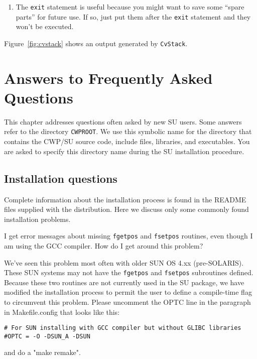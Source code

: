{{{{{{{\begin{enumerate}
\item The \verb:exit: statement is useful because you might want
to save some ``spare parts'' for future use.  If so, just put them
after the \verb:exit: statement and they won't be executed.
\end{enumerate}

\noindent Figure~\ref{fig:cvstack} shows an output generated by \verb:CvStack:.

\chapter{Answers to Frequently Asked Questions}

This chapter addresses questions often asked by new {\small\sf SU} users.
Some answers refer to the directory {\tt CWPROOT}.  We use this
symbolic name for the directory that contains the {\sf CWP/SU} source code, include files, libraries, and executables.  You are asked to specify
this directory name during the {\small\sf SU} installation procedure.

\section{Installation questions}
Complete information about the installation
process is found in the {\sf README}
files supplied with the distribution.
Here we discuss only some commonly found installation problems.

\begin{question}
I get error messages about missing {\tt fgetpos} and {\tt fsetpos} routines, 
even though I am using the {\sf GCC} compiler.
How do I get around this problem?
\end{question}

\begin{rmans}
We've seen this problem most often with older 
{\sf SUN OS} 4.xx (pre-{\sf SOLARIS}). 
These {\sf SUN} systems may not have the {\tt fgetpos} and {\tt fsetpos} subroutines defined.
Because these two routines are not currently used in the {\small\sf SU} package,
we have modified the installation process to permit the
user to define a compile-time flag to circumvent this problem.
Please uncomment the {\sf OPTC} line in the paragraph in Makefile.config
that looks like this:
\begin{verbatim}
# For SUN installing with GCC compiler but without GLIBC libraries
#OPTC = -O -DSUN_A -DSUN
\end{verbatim}
and do a "make remake".
\end{rmans}

}}}}}}}
